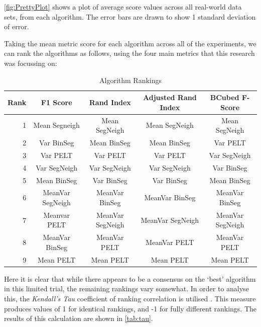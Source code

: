 \documentclass[../main.tex]{subfiles}
\begin{document}
\autoref{fig:PrettyPlot} shows a plot of average score values across all real-world data sets, from each algorithm. The error bars are drawn to show 1 standard deviation of error.

Taking the mean metric score for each algorithm across all of the experiments, we can rank the algorithms as follows, using the four main metrics that this research was focussing on:

\begin{table}[h]
\centering
\begin{tabular}{@{}rcccc@{}}
\toprule
\textbf{Rank} & \textbf{F1 Score} & \textbf{Rand Index} & \textbf{Adjusted Rand Index} & \textbf{BCubed F-Score} \\ \midrule
1 & Mean Segneigh & Mean SegNeigh & Mean SegNeigh & Mean SegNeigh \\
2 & Var BinSeg & Mean BinSeg & Mean BinSeg & Var PELT \\
3 & Var PELT & Var PELT & Var PELT & Var SegNeigh \\
4 & Var SegNeigh & Var SegNeigh & Var SegNeigh & Var BinSeg \\
5 & Mean BinSeg & Var BinSeg & Var BinSeg & Mean BinSeg \\
6 & MeanVar SegNeigh & MeanVar BinSeg & MeanVar BinSeg & MeanVar BinSeg \\
7 & Meanvar PELT & MeanVar SegNeigh & MeanVar SegNeigh & MeanVar SegNeigh \\
8 & MeanVar BinSeg & MeanVar PELT & MeanVar PELT & MeanVar PELT \\
9 & Mean PELT & Mean PELT & Mean PELT & Mean PELT \\ \bottomrule
\end{tabular}
\caption{Algorithm Rankings}
\label{tab:rankings}
\end{table}

Here it is clear that while there appears to be a consensus on the `best' algorithm in this limited trial, the remaining rankings vary somewhat. In order to analyse this, the \emph{Kendall's Tau} coefficient of ranking correlation is utilised \cite{KENDALL1938}. This measure produces values of 1 for identical rankings, and -1 for fully different rankings. The results of this calculation are shown in \autoref{tab:tau}.
\end{document}
